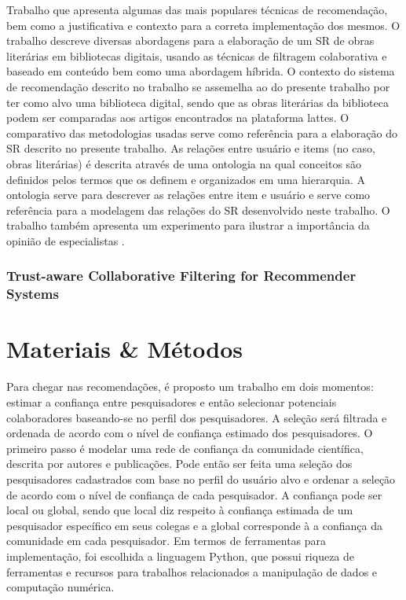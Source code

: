 \documentclass[12pt]{article}
\begin{document}
Trabalho que apresenta algumas das mais populares técnicas de recomendação, bem como a justificativa e contexto para a 
correta implementação dos mesmos. O trabalho descreve diversas abordagens para a elaboração de um SR de obras literárias 
em bibliotecas digitais, usando as técnicas de filtragem colaborativa e baseado em conteúdo bem como uma abordagem híbrida. 
O contexto do sistema de recomendação descrito no trabalho se assemelha ao do presente trabalho por ter como alvo uma 
biblioteca digital, sendo que as obras literárias da biblioteca podem ser comparadas aos artigos encontrados na plataforma 
lattes. O comparativo das metodologias usadas serve como referência para a elaboração do SR descrito no presente trabalho. 
As relações entre usuário e items (no caso, obras literárias) é descrita através de uma ontologia na qual conceitos são 
definidos pelos termos que os definem e organizados em uma hierarquia. A ontologia serve para descrever as relações entre 
item e usuário e serve como referência para a modelagem das relações do SR desenvolvido neste trabalho. O trabalho também 
apresenta um experimento para ilustrar a importância da opinião de especialistas \cite{primo2006tecnicas}.

\subsubsection{Trust-aware Collaborative Filtering for Recommender Systems}

\section{Materiais \& Métodos}

Para chegar nas recomendações, é proposto um trabalho em dois momentos: estimar a confiança entre pesquisadores e então
selecionar potenciais colaboradores baseando-se no perfil dos pesquisadores. A seleção será filtrada e ordenada de acordo com o 
nível de confiança estimado dos pesquisadores. O primeiro passo é modelar uma rede de confiança da comunidade científica, descrita 
por autores e publicações. Pode então ser feita uma seleção dos pesquisadores cadastrados com base no perfil do usuário alvo e 
ordenar a seleção de acordo com o nível de confiança de cada pesquisador. A confiança pode ser local ou global, sendo que local diz 
respeito à confiança estimada de um pesquisador específico em seus colegas e a global corresponde à a confiança da comunidade em 
cada pesquisador. Em termos de ferramentas para implementação, foi escolhida a linguagem Python, que possui riqueza de ferramentas 
e recursos para trabalhos relacionados a manipulação de dados e computação numérica.%
\end{document}
